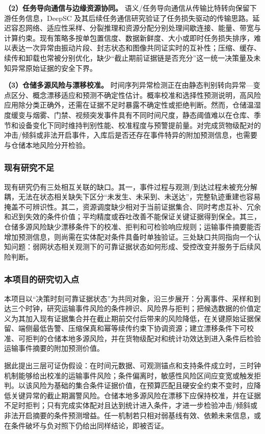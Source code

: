 \textbf{（2）任务导向通信与边缘资源协同。} 语义/任务导向通信从传输比特转向保留下游任务信息，DeepSC 及其后续任务通信研究验证了任务损失驱动的传输思路\cite{xie2021deepsc,taskorientedsemantic2023,distributedtaskoriented2024,goalorientedsemantic2024}。延迟容忍网络、适应性采样、分裂推理和资源分配分别处理间歇连接、能量、带宽与计算约束\cite{reviewonrecent2022,delaytolerantnetworks2025,parametricmachinelearning2024,energyawareadaptive2023,ispliteeimage2024,artificialintelligencedefined2024}。现有策略多按单包置信度、数据新鲜度、大小或即时任务损失排序，难以表达一次异常由振动片段、封志状态和图像共同证实时的互补性；压缩、缓存、续传和卸载也常被分别优化，缺少“截止期前证据链是否充分”这一统一决策量及未知异常原始证据的安全下界。

\textbf{（3）仓储多源风险与漂移校准。} 时间序列异常检测正在由静态判别转向异常—变点区分、概念漂移适应和预测不确定性估计\cite{anomalyandchange2023,conceptdriftadaptation2022,earlyconceptdrift2025,uncertaintyawaretime2024}。概率校准和选择性预测说明，高风险应用除分类正确外，还需在证据不足时暴露不确定性或拒绝判断\cite{guo2017calibration,geifman2017selective}。然而，仓储温湿度缓变与烟雾、门禁、视频突发事件具有不同时间尺度，静态阈值难以在仓库、季节和设备变化下同时维持判别性能、校准程度与预警提前量。对完成货物级配对的冲击/倾斜或非法开启事件，入库后是否还存在事件特异的附加预测信息，也需要与仓储本地风险分开检验。

\subsubsection{现有研究不足}

现有研究仍有三处相互关联的缺口。其一，事件过程与观测/到达过程未被充分解耦，无法在状态相关缺失下区分“未发生、未采到、未送达”，完整轨迹重建也容易掩盖不可辨识性。其二，资源调度缺少相对于当前证据集合、同时考虑互补、冗余和迟到失效的条件价值；平均精度或吞吐改善不能保证关键证据得到保全。其三，仓储多源风险缺少漂移条件下的校准、拒判和可检验响应规则；运输事件摘要能否增加预测信息，则尚需在实体配对条件具备时单独验证。三处缺口共同指向一个认知问题：弱网状态相关观测下的可靠证据状态如何形成、受控改变并服务于后续风险判断。

\subsubsection{本项目的研究切入点}

本项目以“决策时刻可靠证据状态”为共同对象，沿三步展开：分离事件、采样和到达三个时钟，研究运输事件风险的条件辨识、风险界与拒判；把候选数据的价值定义为其加入现有证据集合并在截止期前交付后带来的风险降低，在关键原始证据保留、端侧最低告警、压缩保真和幂等续传约束下协调资源；建立漂移条件下可校准、可拒判的仓储本地多源风险，并在货物级配对和统计功效达到进入条件后检验运输事件摘要的附加预测价值。

据此提出三层可证伪假设：在时间元数据、可观测锚点和支持条件成立时，三时钟机制能够给出校准的运输事件风险；条件偏离时，敏感性风险区间应变宽或触发拒判。以该风险为基础的集合条件证据价值，在预算匹配且硬安全约束不变时，应降低关键异常的截止期漏警风险。仓储本地多源风险在漂移下应保持校准，并在证据不足时拒判；只有完成实体配对且达到统计进入条件，才进一步检验冲击/倾斜或非法开启摘要的条件预测增益。任一机制若只相对弱基线有效、依赖未来信息，或在条件破坏与负对照下仍给出同样结论，即被否证。

